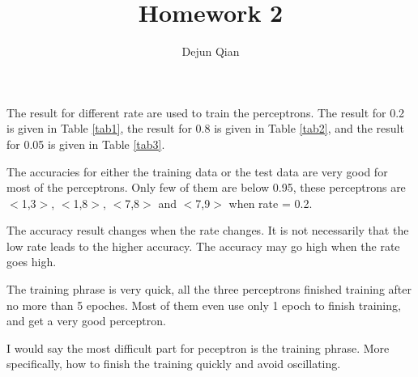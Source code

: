 \documentclass[11pt,letterpaper,oneside]{article}
\title{Homework 2}
\author{Dejun Qian}
\date{}
\begin{document}
\maketitle

The result for different rate are used to train the perceptrons. The result for 0.2 is given in Table \ref{tab1}, the result for 0.8 is given in Table \ref{tab2}, and the result for 0.05 is given in Table \ref{tab3}.

The accuracies for either the training data or the test data are very good for most of the perceptrons. Only few of them are below 0.95, these perceptrons are $<$1,3$>$, $<$1,8$>$, $<$7,8$>$ and $<$7,9$>$ when rate = 0.2.

The accuracy result changes when the rate changes. It is not necessarily that the low rate leads to the higher accuracy. The accuracy may go high when the rate goes high.

The training phrase is very quick, all the three perceptrons finished training after no more than 5 epoches. Most of them even use only 1 epoch to finish training, and get a very good perceptron.

I would say the most difficult part for peceptron is the training phrase. More specifically, how to finish the training quickly and avoid oscillating.
\end{document}
